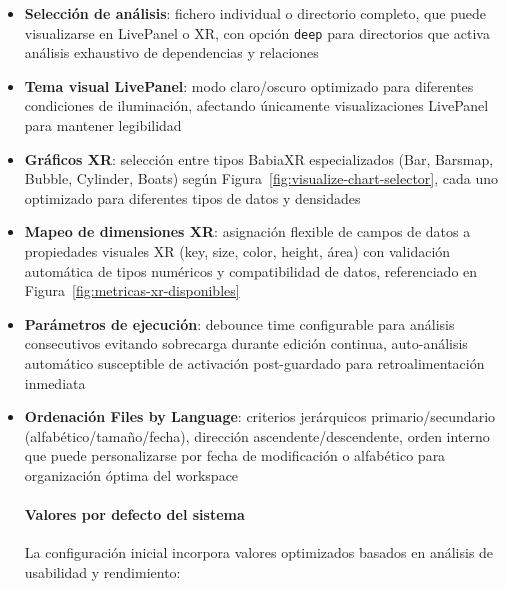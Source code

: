 \documentclass[a4paper, 12pt]{book}
\begin{document}
\begin{itemize}
  \item \textbf{Selección de análisis}: fichero individual o directorio completo, que puede visualizarse en LivePanel o XR, con opción \texttt{deep} para directorios que activa análisis exhaustivo de dependencias y relaciones
  \item \textbf{Tema visual LivePanel}: modo claro/oscuro optimizado para diferentes condiciones de iluminación, afectando únicamente visualizaciones LivePanel para mantener legibilidad
  \item \textbf{Gráficos XR}: selección entre tipos BabiaXR especializados (Bar, Barsmap, Bubble, Cylinder, Boats) según Figura~\ref{fig:visualize-chart-selector}, cada uno optimizado para diferentes tipos de datos y densidades
  \item \textbf{Mapeo de dimensiones XR}: asignación flexible de campos de datos a propiedades visuales XR (key, size, color, height, área) con validación automática de tipos numéricos y compatibilidad de datos, referenciado en Figura~\ref{fig:metricas-xr-disponibles}
  \item \textbf{Parámetros de ejecución}: debounce time configurable para análisis consecutivos evitando sobrecarga durante edición continua, auto-análisis automático susceptible de activación post-guardado para retroalimentación inmediata
  \item \textbf{Ordenación Files by Language}: criterios jerárquicos primario/secundario (alfabético/tamaño/fecha), dirección ascendente/descendente, orden interno que puede personalizarse por fecha de modificación o alfabético para organización óptima del workspace

\paragraph{Valores por defecto del sistema}
La configuración inicial incorpora valores optimizados basados en análisis de usabilidad y rendimiento:


\end{itemize}
\end{document}
